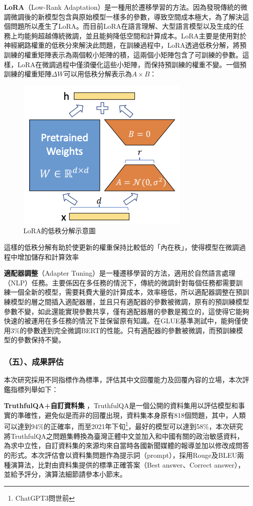 \documentclass[12pt,a4paper,MingLiU,UTF8,natbib]{article}
\def\xeCJKembold{0.4}
\def\saveCJKnode{\dimen255\lastkern}
\def\restoreCJKnode{\kern-\dimen255\kern\dimen255}
\let\CJKoldsymbol\CJKsymbol
\let\CJKoldpunctsymbol\CJKpunctsymbol
\def\CJKfakeboldsymbol#1{%
	\special{pdf:literal direct 2 Tr \xeCJKembold\space w}%
	\CJKoldsymbol{#1}%
	\saveCJKnode
	\special{pdf:literal direct 0 Tr}%
	\restoreCJKnode}
\def\CJKfakeboldpunctsymbol#1{%
	\special{pdf:literal direct 2 Tr \xeCJKembold\space w}%
	\CJKoldpunctsymbol{#1}%
	\saveCJKnode
	\special{pdf:literal direct 0 Tr}%
	\restoreCJKnode}
\newcommand\CJKfakebold[1]{%
	\let\CJKsymbol\CJKfakeboldsymbol
	\let\CJKpunctsymbol\CJKfakeboldpunctsymbol
	#1%
	\let\CJKsymbol\CJKoldsymbol
	\let\CJKpunctsymbol\CJKoldpunctsymbol}
\begin{document}
	\textbf{LoRA}（Low-Rank Adaptation）是一種用於遷移學習的方法。因為發現傳統的微調微調後的新模型包含與原始模型一樣多的參數，導致空間成本極大，為了解決這個問題所以產生了LoRA。而目前LoRA在語言理解、大型語言模型以及生成的任務上均能夠超越傳統微調，並且能夠降低空間和計算成本。LoRA主要是使用對於神經網路權重的低秩分來解決此問題，在訓練過程中，LoRA透過低秩分解，將預訓練的權重矩陣表示為兩個較小矩陣的積，這兩個小矩陣包含了可訓練的參數。這樣，LoRA在微調過程中僅須優化這些小矩陣，而保持預訓練的權重不變。一個預訓練的權重矩陣$\Delta W$可以用低秩分解表示為$A×B$：
	\begin{figure}[H]
		\centering
	\includegraphics{20120468S5MbIQ5N0s}
	\caption{LoRA的低秩分解示意圖\protect\cite{hu2021lora}}
	\end{figure}
這樣的低秩分解有助於使更新的權重保持比較低的「內在秩」，使得模型在微調過程中增加儲存和計算效率\cite{hu2021lora}

	\textbf{適配器調整}（Adapter Tuning）是一種遷移學習的方法，適用於自然語言處理（NLP）任務。主要係因在多任務的情況下，傳統的微調針對每個任務都需要訓練一個全新的模型，需要耗費大量的計算成本，效率極低，所以適配器調整在預訓練模型的層之間插入適配器層，並且只有適配器的參數被微調，原有的預訓練模型參數不變，如此還能實現參數共享，僅有適配器層的參數是獨立的，這使得它能夠快速的被運用在多任務的情況下並保留原有知識。在GLUE基準測試中，能夠僅使用3\%的參數達到完全微調BERT的性能。只有適配器的參數被微調，而預訓練模型的參數保持不變。\cite{zhou2022efficiently}


	\subsubsection{（五）、成果評估}
	本次研究採用不同指標作為標準，評估其中文回覆能力及回覆內容的立場，本次評鑑指標列舉如下：

	\CJKfakebold{\textbf{TruthfulQA+自訂資料集}}，TruthfulQA是一個公開的資料集用以評估模型和事實的準確性，避免似是而非的回覆出現，資料集本身原有818個問題，其中，人類可以達到94\%的正確率，而至2021年下旬\footnote{ChatGPT3問世前}，最好的模型可以達到58\%\cite{lin2022truthfulqa}，本次研究將TruthfulQA之問題集轉換為臺灣正體中文並加入和中國有關的政治敏感資料，為求中立性，自訂資料集的來源均來自當時各國新聞媒體的報導並加以修改成問答的形式。本次評估會以資料集問題作為提示詞（prompt），採用Rouge及BLEU兩種演算法，比對由資料集提供的標準正確答案（Best answer、Correct answer），並給予評分，演算法細節請參本小節末。
\end{document}
